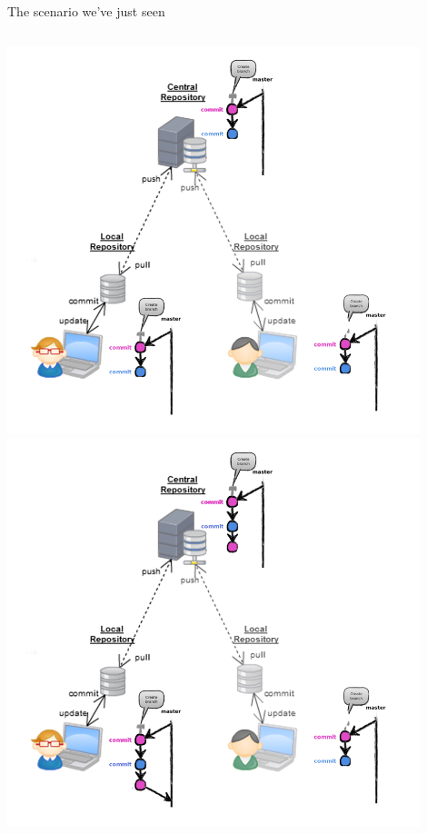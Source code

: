\begin{frame}[fragile]{The scenario we've just seen}
\begin{columns}
\begin{column}{0.4\textwidth}
\begin{center}
{				\includegraphics[width=0.9\textwidth]{multiuser_pull.png}
			}\only<5> {
				\includegraphics[width=0.9\textwidth]{multiuser_my_merge.png}
			}\only<6> {
}
\end{center}
\end{column}
\end{columns}
\end{frame}
